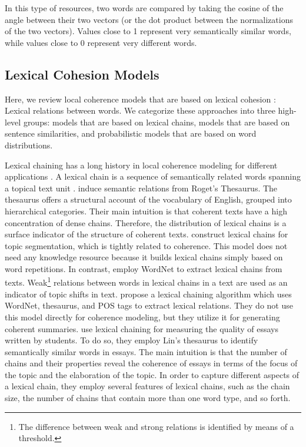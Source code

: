 In this type of resources, two words are compared by taking the cosine of the angle between their two vectors (or the dot product between the normalizations of the two vectors). 
Values close to 1 represent very semantically similar words, while values close to 0 represent very different words. 

\subsection{Lexical Cohesion Models}

Here, we review local coherence models that are based on lexical cohesion \cite{halliday76}: Lexical relations between words. 
We categorize these approaches into three high-level groups: models that are based on lexical chains,  models that are based on sentence similarities, and probabilistic models that are based on word distributions.  

Lexical chaining has a long history in local coherence modeling for different applications \cite{morris91,fenglijun09,wongbillytm12,benguosheng13,flor13}. 
A lexical chain is a sequence of semantically related words spanning a topical text unit \cite{morris91}. 
 induce semantic relations from Roget's Thesaurus. 
The thesaurus offers a structural account of the vocabulary of English, grouped into hierarchical categories. 
Their main intuition is that coherent texts have a high concentration of dense chains. 
Therefore, the distribution of lexical chains is a surface indicator of the structure of coherent texts. 
 construct lexical chains for topic segmentation, which is tightly related to coherence. 
This model does not need any knowledge resource because it builds lexical chains simply based on word repetitions. 
In contrast,  employ WordNet to extract lexical chains from texts.  
Weak\footnote{The difference between weak and strong relations is identified by means of a threshold.} relations between words in lexical chains in a text are used as an indicator of topic shifts in  text. 
 propose a lexical chaining algorithm which uses WordNet, thesaurus, and POS tags to extract lexical relations. 
They do not use this model directly for coherence modeling, but they utilize it for generating coherent summaries. 
 use lexical chaining for measuring the quality of essays written by students. 
To do so, they employ Lin’s thesaurus \cite{lindekang98} to identify semantically similar words in essays.   
The main intuition is that the number of chains and their properties reveal the coherence of essays in terms of the focus of the topic and the elaboration of the topic. 
In order to capture different aspects of a lexical chain, they employ several features of lexical chains, such as the chain size, the number of chains that contain more than one word type, and so forth. 

